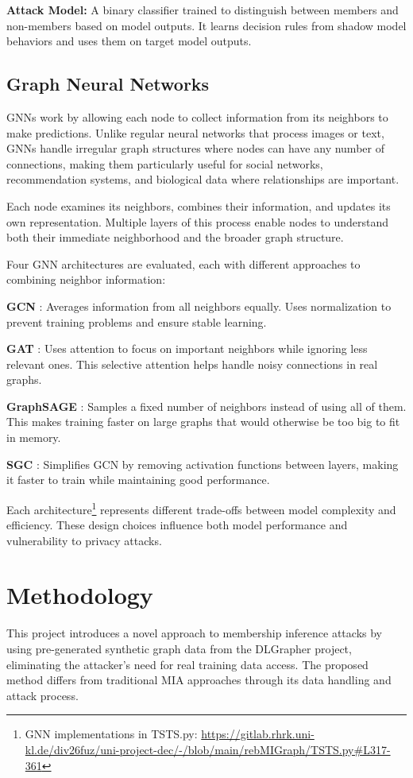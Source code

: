 \documentclass{article}
\begin{document}
\textbf{Attack Model:} A binary classifier trained to distinguish between members and non-members based on model outputs. It learns decision rules from shadow model behaviors and uses them on target model outputs.

\subsection{Graph Neural Networks}
GNNs work by allowing each node to collect information from its neighbors to make predictions. Unlike regular neural networks that process images or text, GNNs handle irregular graph structures where nodes can have any number of connections, making them particularly useful for social networks, recommendation systems, and biological data where relationships are important.

Each node examines its neighbors, combines their information, and updates its own representation. Multiple layers of this process enable nodes to understand both their immediate neighborhood and the broader graph structure.

Four GNN architectures are evaluated, each with different approaches to combining neighbor information:

\textbf{GCN} \cite{kipf2017semi}: Averages information from all neighbors equally. Uses normalization to prevent training problems and ensure stable learning.

\textbf{GAT} \cite{velickovic2018graph}: Uses attention to focus on important neighbors while ignoring less relevant ones. This selective attention helps handle noisy connections in real graphs.

\textbf{GraphSAGE} \cite{hamilton2017inductive}: Samples a fixed number of neighbors instead of using all of them. This makes training faster on large graphs that would otherwise be too big to fit in memory.

\textbf{SGC} \cite{wu2019simplifying}: Simplifies GCN by removing activation functions between layers, making it faster to train while maintaining good performance.

Each architecture\footnote{GNN implementations in TSTS.py: \url{https://gitlab.rhrk.uni-kl.de/div26fuz/uni-project-dec/-/blob/main/rebMIGraph/TSTS.py\#L317-361}} represents different trade-offs between model complexity and efficiency. These design choices influence both model performance and vulnerability to privacy attacks.

\section{Methodology}
This project introduces a novel approach to membership inference attacks by using pre-generated synthetic graph data from the DLGrapher project\cite{lan2024dlgrapher}, eliminating the attacker's need for real training data access. The proposed method differs from traditional MIA approaches through its data handling and attack process.
\end{document}
